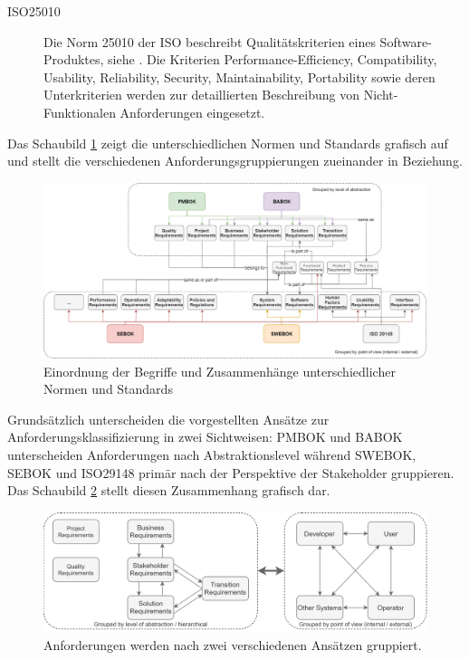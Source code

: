 \begin{description}
  \item[ISO25010] Die Norm 25010 der \ac{ISO} beschreibt Qualitätskriterien eines Software-Produktes, siehe \cite{ISO25010}. Die Kriterien Performance-Efficiency, Compatibility, Usability, Reliability, Security, Maintainability, Portability sowie deren Unterkriterien werden zur detaillierten Beschreibung von Nicht-Funktionalen Anforderungen eingesetzt.
\end{description}
Das Schaubild \ref{fig:chapter05:requirements} zeigt die unterschiedlichen Normen und Standards grafisch auf und stellt die verschiedenen Anforderungsgruppierungen zueinander in Beziehung.

\begin{figure}[htbp]
 \centering
 \includegraphics[width=1.0\textwidth]{gfx/Requirements.png}
 \caption{Einordnung der Begriffe und Zusammenhänge unterschiedlicher Normen und Standards}
 \label{fig:chapter05:requirements}
\end{figure}

Grundsätzlich unterscheiden die vorgestellten Ansätze zur Anforderungsklassifizierung in zwei Sichtweisen: \ac{PMBOK} und \ac{BABOK} unterscheiden Anforderungen nach Abstraktionslevel während \ac{SWEBOK}, \ac{SEBOK} und ISO29148 primär nach der Perspektive der Stakeholder gruppieren. Das Schaubild \ref{fig:chapter05:requirements_grouping} stellt diesen Zusammenhang grafisch dar.

\begin{figure}[htbp]
 \centering
 \includegraphics[width=1.0\textwidth]{gfx/Requirements_Grouping.png}
 \caption{Anforderungen werden nach zwei verschiedenen Ansätzen gruppiert.}
 \label{fig:chapter05:requirements_grouping}
\end{figure}

